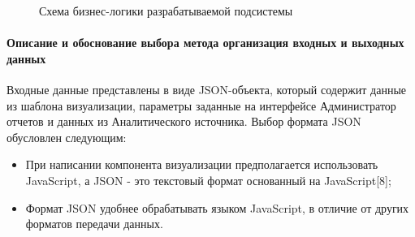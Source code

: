 \documentclass[a4paper]{extarticle}
\numberwithin{equation}{section}
\begin{document}
\begin{figure}[H]
\centering
\caption{Схема бизнес-логики разрабатываемой подсистемы}
\label{ris2}
\end{figure}\par

\paragraph{Описание и обоснование выбора метода организация входных и выходных данных}
Входные данные представлены в виде JSON-объекта, который содержит данные из шаблона визуализации, параметры заданные на интерфейсе Администратор отчетов и данных из Аналитического источника. Выбор формата JSON обусловлен следующим:
\begin{itemize}
\item При написании компонента визуализации предполагается использовать JavaScript, а JSON - это текстовый формат основанный на JavaScript[8];
\item Формат JSON удобнее обрабатывать языком JavaScript, в отличие от других форматов передачи данных.
\end{itemize}
\end{document}
